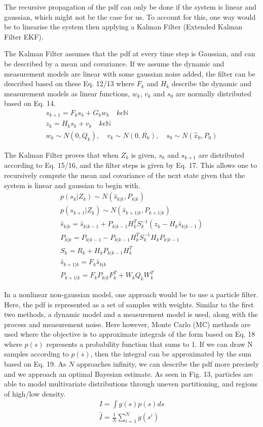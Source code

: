 \documentclass[15pt]{article}
\begin{document}
The recursive propagation of the pdf can only be done if the system is linear and gaussian, which might not be the case for us. To account for this, one way would be to linearise the system then applying a Kalman Filter (Extended Kalman Filter EKF).

The Kalman Filter assumes that the pdf at every time step is Gaussian, and can be described by a mean and covariance. If we assume the dynamic and measurement models are linear with some gaussian noise added, the filter can be described based on these Eq. 12/13 where $F_{k}$ and $H_{k}$ describe the dynamic and measurement models as linear functions, $w_{k}$, $v_{k}$ and $s_{0}$ are normally distributed based on Eq. 14. 
\begin{gather}
s_{k+1}=F_{k}s_{k}+G_{k}w_{k}\quad k\epsilon\mathbb{N} \\
z_{k}=H_{k}s_{k}+v_{k}\quad k\epsilon\mathbb{N} \\
w_{k}\sim N(0,Q_{k}),\quad v_{k}\sim N(0,R_{k}),\quad s_{0}\sim N(\hat{x}_{0},P_{0})
\end{gather}

The Kalman Filter proves that when $Z_{k}$ is given, $s_{k}$ and $s_{k+1}$ are distributed according to Eq. 15/16, and the filter steps is given by Eq. 17. This allows one to recursively compute the mean and covariance of the next state given that the system is linear and gaussian to begin with.
\begin{gather}
p(s_{k}|Z_{k})\sim N(\hat{s}_{k|k},P_{k|k}) \\
p(s_{k+1}|Z_{k})\sim N(\hat{s}_{k+1|k},P_{k+1|k}) \\
\hat{s}_{k|k}=\hat{s}_{k|k-1}+P_{k|k-1}H_{k}^{T}S_{k}^{-1}(z_{k}-H_{k}\hat{s}_{k|k-1}) \nonumber\\
P_{k|k}=P_{k|k-1}-P_{k|k-1}H_{k}^{T}S_{k}^{-1}H_{k}P_{k|k-1} \nonumber\\
S_{k}=R_{k}+H_{k}P_{k|k-1}H_{k}^{T} \nonumber\\
\hat{s}_{k+1|k}=F_{k}\hat{s}_{k|k} \nonumber\\
P_{k+1|k}=F_{k}P_{k|k}F_{k}^{T}+W_{k}Q_{k}W_{k}^{T}
\end{gather}

In a nonlinear non-gaussian model, one approach would be to use a particle filter. Here, the pdf is represented as a set of samples with weights. Similar to the first two methods, a dynamic model and a measurement model is used, along with the process and measurement noise. Here however, Monte Carlo (MC) methods are used where the objective is to approximate integrals of the form based on Eq. 18 where $p(s)$ represents a probability function that sums to 1. If we can draw N samples according to $p(s)$, then the integral can be approximated by the sum based on Eq. 19. As $N$ approaches infinity, we can describe the pdf more precisely and we approach an optimal Bayesian estimate. As seen in Fig. 13, particles are able to model multivariate distributions through uneven partitioning, and regions of high/low density.
\begin{gather}
I=\int g(s)p(s)ds \\
\hat{I}=\frac{1}{N}\sum_{i=1}^{N}g(s^{i})
\end{gather}
\end{document}
